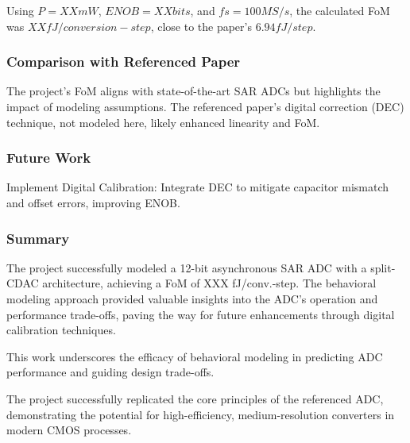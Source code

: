 Using $P= XX mW$, $ENOB=XX bits$, and $fs=100MS/s$, the calculated FoM was $XX fJ/conversion-step$, close to the paper's $6.94 fJ/step$.

\subsubsection{Comparison with Referenced Paper}

    The project's FoM aligns with state-of-the-art SAR ADCs but highlights the impact of modeling assumptions. The referenced paper's digital correction (DEC) technique, not modeled here, likely enhanced linearity and FoM.

\subsubsection{Future Work}

Implement Digital Calibration: Integrate DEC to mitigate capacitor mismatch and offset errors, improving ENOB.

\subsubsection{Summary}
The project successfully modeled a 12-bit asynchronous SAR ADC with a split-CDAC architecture, achieving a FoM of XXX fJ/conv.-step. The behavioral modeling approach provided valuable insights into the ADC's operation and performance trade-offs, paving the way for future enhancements through digital calibration techniques.

This work underscores the efficacy of behavioral modeling in predicting ADC performance and guiding design trade-offs. 

The project successfully replicated the core principles of the referenced ADC, demonstrating the potential for high-efficiency, medium-resolution converters in modern CMOS processes. 